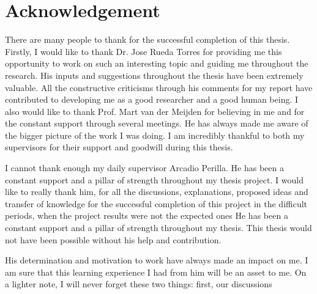 \chapter*{Acknowledgement}

There are many people to thank for the successful completion of this thesis. Firstly, I would like to thank Dr. Jose Rueda Torres for providing me this opportunity to work on such an interesting topic and guiding me throughout the research. His inputs and suggestions throughout the thesis have been extremely valuable. All the constructive criticisms through his comments for my report have contributed to developing me as a good researcher and a good human being. I also would like to thank Prof. Mart van der Meijden for believing in me and for the constant support through several meetings. He has always made me aware of the bigger picture of the work I was doing. I am incredibly thankful to both my supervisors for their support and goodwill during this thesis. 


I cannot thank enough my daily supervisor Arcadio Perilla. He has been a constant support and a pillar of strength throughout my thesis project. I would like to really thank him, for all the discussions, explanations, proposed ideas and transfer of knowledge for the successful completion of this project  
in the difficult periods, when the project results were not the expected ones He has been a constant support and a pillar of strength throughout my thesis. This thesis would not have been possible without his help and contribution. 

His determination and motivation to work have always made an impact on me. I am sure that this learning experience I had from him will be an asset to me. On a lighter note, I will never forget these two things: first, our discussions 


